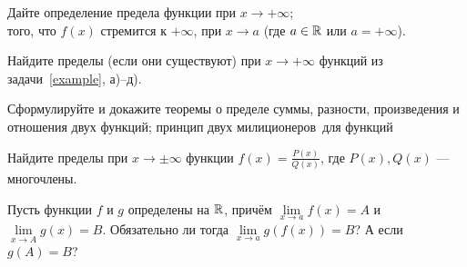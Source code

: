 \documentclass[a4paper, 12pt]{article}
\newcommand{\0}[1]{\overline{#1}}
\begin{document}

 Дайте определение
 предела функции при $x \to +\infty$;\\
 того, что $f(x)$ стремится к $+\infty$, при $x \to a$
(где $a\in \mathbb{R}$ или $a=+\infty$).

 Найдите пределы (если они существуют) при
$x \to +\infty$ функций из задачи~\ref{example}, а)--д).










Сформулируйте и докажите
 теоремы о пределе суммы, разности,
произведения и отношения двух функций;
 принцип двух милиционеров\ для функций




 Найдите пределы при $x \to \pm \infty$ функции $f(x)=\frac{P(x)}{Q(x)}$,
где $P(x),Q(x)$ --- многочлены. %

 Пусть функции $f$ и $g$ определены на $\mathbb{R}$, прич\"ем
$\lim\limits_{x \to a}f(x)=A$ и $\lim\limits_{x \to A}g(x)=B$.
Обязательно ли тогда $\lim\limits_{x \to a}g(f(x))=B$?
 А если $g(A)=B$?

\end{document}
